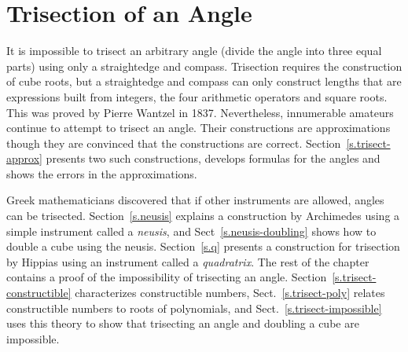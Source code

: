 
\chapter{Trisection of an Angle}\label{c.trisect}




It is impossible to trisect an arbitrary angle (divide the angle into three equal parts) using only a straightedge and compass. Trisection requires the construction of cube roots, but a straightedge and compass can only construct lengths that are expressions built from integers, the four arithmetic operators and square roots. This was proved by Pierre Wantzel in 1837. Nevertheless, innumerable amateurs continue to attempt to trisect an angle. Their constructions are approximations though they are convinced that the constructions are correct. Section~\ref{s.trisect-approx} presents two such constructions, develops formulas for the angles and shows the errors in the approximations.

Greek mathematicians discovered that if other instruments are allowed, angles can be trisected. Section~\ref{s.neusis} explains a construction by Archimedes using a simple instrument called a \emph{neusis}, and Sect~\ref{s.neusis-doubling} shows how to double a cube using the neusis. Section~\ref{s.q} presents a construction for trisection by Hippias using an instrument called a \emph{quadratrix}. The rest of the chapter contains a proof of the impossibility of trisecting an angle. Section~\ref{s.trisect-constructible} characterizes constructible numbers, Sect.~\ref{s.trisect-poly} relates constructible numbers to roots of polynomials, and Sect.~\ref{s.trisect-impossible} uses this theory to show that trisecting an angle and doubling a cube are impossible.

